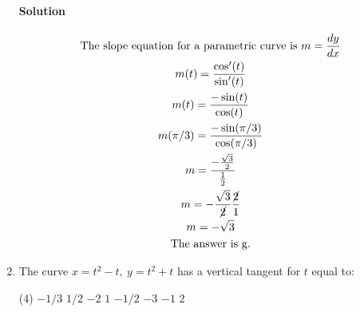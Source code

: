 \documentclass[MATH-115-Notes.tex]{subfiles}
\begin{document}
\begin{enumerate}[itemsep=5mm]
    \paragraph*{Solution}
    \begin{gather*}
        \text{The slope equation for a parametric curve is } m = \frac{dy}{dx}\\
        m(t) = \frac{\cos'(t)}{\sin'(t)}\\
        m(t) = \frac{-\sin(t)}{\cos(t)}\\
        m(\pi/3) = \frac{-\sin(\pi/3)}{\cos(\pi/3)}\\
        m = \frac{-\frac{\sqrt{3}}{2}}{\frac{1}{2}}\\
        m = -\frac{\sqrt{3}}{\cancel{2}} \frac{\cancel{2}}{1}\\
        m = -\sqrt{3}\\
        \text{The answer is g.}
    \end{gather*}


    \item The curve $x = t^2 - t,\ y = t^2 + t$ has a vertical tangent for $t$ equal to:
    \begin{tasks}(4)
        \task \(-1/3\)
        \task \(1/2\)
        \task \(-2\)
        \task \(1\)
        \task \(-1/2\)
        \task \(-3\)
        \task \(-1\)
        \task \(2\)
    \end{tasks}

\end{enumerate}
\end{document}
